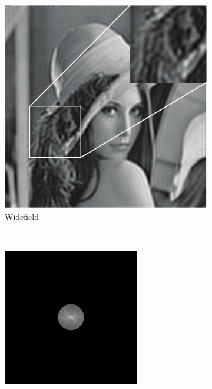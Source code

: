 \begin{figure}[h]
  \centering
  \begin{subfigure}[t]{0.23\textwidth}
      \centering
      \includegraphics[width=\textwidth]{widefield_slit/widefield}
      \caption{Widefield}
  \end{subfigure}~
  \begin{subfigure}[t]{0.23\textwidth}
      \centering
      \includegraphics[width=\textwidth]{widefield_slit/widefield_fft}

\end{subfigure}
\end{figure}

